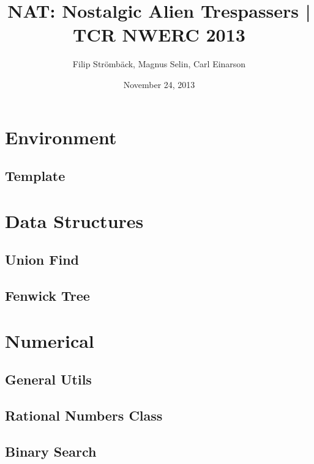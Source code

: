 \documentclass[a4paper]{article}
\title{NAT: Nostalgic Alien Trespassers | TCR NWERC 2013}
\date{November 24, 2013}
\author{Filip Str\"{o}mb\"{a}ck, Magnus Selin, Carl Einarson}
\begin{document}
\maketitle
\begin{multicols}{2}
\tableofcontents
\end{multicols}
\newpage
\scriptsize



\begin{multicols}{3}

\section{Environment}
\subsection{Template}


\section{Data Structures}
\subsection{Union Find}



\subsection{Fenwick Tree}


\section{Numerical}

\subsection{General Utils}


\subsection{Rational Numbers Class}


\subsection{Binary Search}



\end{multicols}
\end{document}
